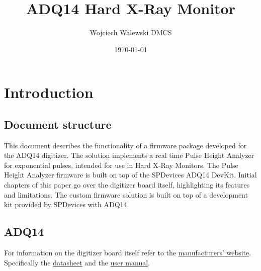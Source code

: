 \documentclass[a4paper,12pt,table]{article}
\title{ADQ14 Hard X-Ray Monitor}
\author{Wojciech Walewski \newline DMCS}
\date{\today}
\begin{document}
\maketitle

\tableofcontents
\clearpage

\section{Introduction}

	\subsection{Document structure}
	This document describes the functionality of a firmware package developed for the ADQ14 digitizer.
	The solution implements a real time Pulse Height Analyzer for exponential pulses, 
	intended for use in Hard X-Ray Monitors. 
	The Pulse Height Analyzer firmware is built on top of the SPDevices ADQ14 DevKit.
	Initial chapters of this paper go over the digitizer board itself, 
	highlighting its features and limitations.
	The custom firmware solution is built on top of a development kit provided by SPDevices with ADQ14.
	\subsection{ADQ14}
	For information on the digitizer board itself refer to the 
	\href{https://www.spdevices.com/products/hardware/14-bit-digitizers/adq14}{manufacturers' website}.
	Specifically the 
	\href{https://www.spdevices.com/documents/datasheets/19-adq14-datasheet/file}{datasheet} 
	and the \href{https://www.spdevices.com/documents/user-guides/55-adq14-manual/file}{user manual}.
	
\newpage
\end{document}

